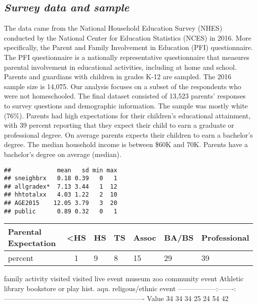 \documentclass[
  12pt,
]{article}
\begin{document}
\hypertarget{survey-data-and-sample}{%
\subsection{\texorpdfstring{\textbf{\emph{Survey data and
sample}}}{Survey data and sample}}\label{survey-data-and-sample}}

The data came from the National Household Education Survey (NHES)
conducted by the National Center for Education Statistics (NCES) in
2016. More specifically, the Parent and Family Involvement in Education
(PFI) questionnaire. The PFI questionnaire is a nationally
representative questionnaire that measures parental involvement in
educational activities, including at home and school. Parents and
guardians with children in grades K-12 are sampled. The 2016 sample size
is 14,075. Our analysis focuses on a subset of the respondents who were
not homeschooled. The final dataset consisted of 13,523 parents'
responses to survey questions and demographic information. The sample
was mostly white (76\%). Parents had high expectations for their
children's educational attainment, with 39 percent reporting that they
expect their child to earn a graduate or professional degree. On average
parents expects their children to earn a bachelor's degree. The median
household income is between \$60K and 70K. Parents have a bachelor's
degree on average (median).

\begin{verbatim}
##             mean   sd min max
## sneighbrx   0.18 0.39   0   1
## allgradex*  7.13 3.44   1  12
## hhtotalxx   4.03 1.22   2  10
## AGE2015    12.05 3.79   3  20
## public      0.89 0.32   0   1
\end{verbatim}

\begin{longtable}[]{@{}lclllll@{}}
\toprule
Parental Expectation & \textless HS & HS & TS & Assoc & BA/BS &
Professional\tabularnewline
\midrule
\endhead
percent & 1 & 9 & 8 & 15 & 29 & 39\tabularnewline
\bottomrule
\end{longtable}

\textbar family activity \textbar{} visited \textbar{} visited
\textbar{} live event \textbar{} museum \textbar{} zoo \textbar{}
community event \textbar{} Athletic \textbar{} \textbar{} \textbar{}
library \textbar{} bookstore \textbar{} or play \textbar{} hist.
\textbar{} aqu.\textbar{} religous/ethnic \textbar{} event \textbar{}
\textbar-----------------\textbar:-------:\textbar-----------\textbar------------\textbar--------\textbar-----\textbar-----------------\textbar----------\textbar{}
\textbar Value \textbar{} 34 \textbar{} 34 \textbar{} 34 \textbar{} 25
\textbar{} 24\textbar{} 54 \textbar{} 42 \textbar{}
\end{document}
